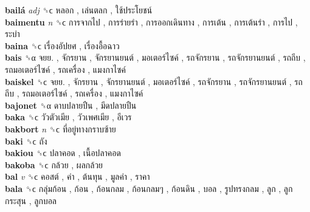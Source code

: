 \textbf{bailá} \emph{adj}  ␝ϲ   หลอก ,  เล่นตลก ,  ใช้ประโยชน์   \\
\textbf{baimentu} \emph{n}  ␝ϲ   การจากไป ,  การร่ายรำ ,  การออกเดินทาง ,  การเต้น ,  การเต้นรำ ,  การไป ,  ระบำ   \\
\textbf{baina} ␝ϲ   เรื่องอัปยศ ,  เรื่องอื้อฉาว   \\
\textbf{bais} ␝α   จยย. ,  จักรยาน ,  จักรยานยนต์ ,  มอเตอร์ไซค์ ,  รถจักรยาน ,  รถจักรยานยนต์ ,  รถถีบ ,  รถมอเตอร์ไซค์ ,  รถเครื่อง ,  แมงกาไซค์   \\
\textbf{baiskel} ␝ϲ   จยย. ,  จักรยาน ,  จักรยานยนต์ ,  มอเตอร์ไซค์ ,  รถจักรยาน ,  รถจักรยานยนต์ ,  รถถีบ ,  รถมอเตอร์ไซค์ ,  รถเครื่อง ,  แมงกาไซค์   \\
\textbf{bajonet} ␝α   ดาบปลายปืน ,  มีดปลายปืน   \\
\textbf{baka} ␝ϲ   วัวตัวเมีย ,  วัวเพศเมีย ,  อีเวร   \\
\textbf{bakbort} \emph{n}  ␝ϲ   ที่อยู่ทางกราบซ้าย   \\
\textbf{baki} ␝ϲ   ถัง   \\
\textbf{bakiou} ␝ϲ   ปลาคอด ,  เนื้อปลาคอด   \\
\textbf{bakoba} ␝ϲ   กล้วย ,  ผลกล้วย   \\
\textbf{bal} \emph{v}  ␝ϲ   คอสต์ ,  ค่า ,  ต้นทุน ,  มูลค่า ,  ราคา   \\
\textbf{bala} ␝ϲ   กลุ่มก้อน ,  ก้อน ,  ก้อนกลม ,  ก้อนกลมๆ ,  ก้อนดิน ,  บอล ,  รูปทรงกลม ,  ลูก ,  ลูกกระสุน ,  ลูกบอล   \\
